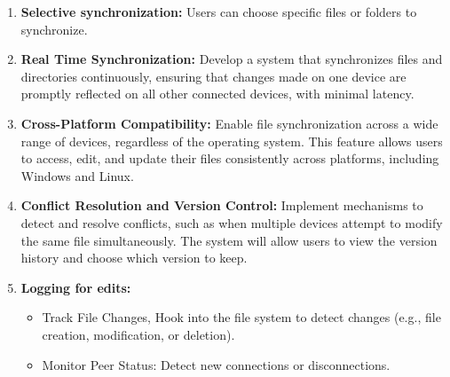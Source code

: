 \documentclass{article}
\begin{document}
                    \begin{enumerate}
                        \item \textbf{Selective synchronization:} Users can choose specific files or folders to synchronize.
                        \item \textbf{Real Time Synchronization:} Develop a system that synchronizes files and directories continuously, ensuring that changes made on one device are promptly reflected on all other connected devices, with minimal latency.
                        \item \textbf{Cross-Platform Compatibility:} Enable file synchronization across a wide range of devices, regardless of the operating system. This feature allows users to access, edit, and update their files consistently across platforms, including Windows and Linux.
                        \item \textbf{Conflict Resolution and Version Control:} Implement mechanisms to detect and resolve conflicts, such as when multiple devices attempt to modify the same file simultaneously. The system will allow users to view the version history and choose which version to keep.
                        \item \textbf{Logging for edits:} 
                         \begin{itemize}
                             \item Track File Changes, Hook into the file system to detect changes (e.g., file creation, modification, or deletion).
                             \item Monitor Peer Status: Detect new connections or disconnections.
                         \end{itemize}   
                    \end{enumerate}
                        
\end{document}
